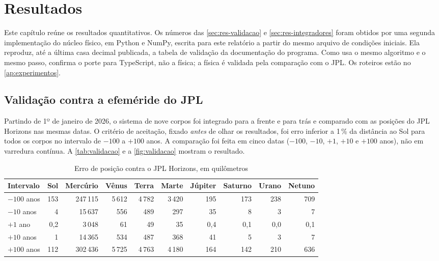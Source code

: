 \chapter{Resultados}\label{cap:resultados}

Este capítulo reúne os resultados quantitativos. Os números das \autoref{sec:res-validacao} e \ref{sec:res-integradores} foram obtidos por uma segunda implementação do núcleo físico, em Python e NumPy, escrita para este relatório a partir do mesmo arquivo de condições iniciais. Ela reproduz, até a última casa decimal publicada, a tabela de validação da documentação do programa. Como usa o mesmo algoritmo e o mesmo passo, confirma o porte para TypeScript, não a física; a física é validada pela comparação com o JPL. Os roteiros estão no \autoref{ap:experimentos}.

\section{Validação contra a efeméride do JPL}\label{sec:res-validacao}

Partindo de 1º de janeiro de 2026, o sistema de nove corpos foi integrado para a frente e para trás e comparado com as posições do JPL Horizons nas mesmas datas. O critério de aceitação, fixado \emph{antes} de olhar os resultados, foi erro inferior a 1\,\% da distância ao Sol para todos os corpos no intervalo de $-100$ a $+100$ anos. A comparação foi feita em cinco datas ($-100$, $-10$, $+1$, $+10$ e $+100$ anos), não em varredura contínua. A \autoref{tab:validacao} e a \autoref{fig:validacao} mostram o resultado.

\begin{table}[htb]
  \centering
  \caption{Erro de posição contra o JPL Horizons, em quilômetros}
  \label{tab:validacao}
  \small
  \setlength{\tabcolsep}{4pt}
  \begin{tabular}{lrrrrrrrrr}
    \toprule
    Intervalo & Sol & Mercúrio & Vênus & Terra & Marte & Júpiter & Saturno & Urano & Netuno \\
    \midrule
    $-100$ anos & 153 & 247\,115 & 5\,612 & 4\,782 & 3\,420 & 195 & 173 & 238 & 709 \\
    $-10$ anos  & 4   & 15\,637  & 556    & 489    & 297    & 35  & 8   & 3   & 7 \\
    $+1$ ano    & 0,2 & 3\,048   & 61     & 49     & 35     & 0,4 & 0,1 & 0,0 & 0,1 \\
    $+10$ anos  & 1   & 14\,365  & 534    & 487    & 368    & 41  & 5   & 3   & 7 \\
    $+100$ anos & 112 & 302\,436 & 5\,725 & 4\,763 & 4\,180 & 164 & 142 & 210 & 636 \\
    \bottomrule
  \end{tabular}
\end{table}

